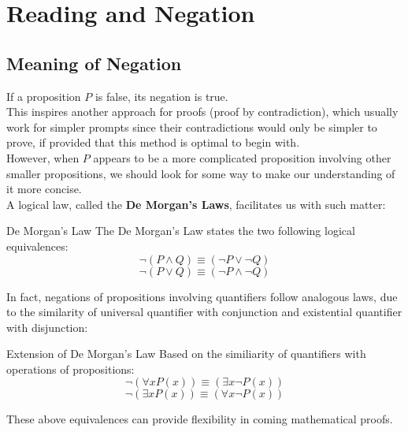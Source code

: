 \section{Reading and Negation}
\subsection{Meaning of Negation}
If a proposition $P$ is false, its negation is true. \\
This inspires another approach for proofs (proof by contradiction), which usually work for simpler prompts since their contradictions would only be simpler to prove, if provided that this method is optimal to begin with. \\
However, when $P$ appears to be a more complicated proposition involving other smaller propositions, we should look for some way to make our understanding of it more concise. \\
A logical law, called the \textbf{De Morgan's Laws}, facilitates us with such matter:
\begin{ln-axiom}{De Morgan's Law}{}
    The De Morgan's Law states the two following logical equivalences:
    \[\neg (P \land Q) \equiv (\neg P \lor \neg Q)\]
    \[\neg (P \lor Q) \equiv (\neg P \land \neg Q)\]
\end{ln-axiom}
In fact, negations of propositions involving quantifiers follow analogous laws, due to the similarity of universal quantifier with conjunction and existential quantifier with disjunction:
\begin{ln-axiom}{Extension of De Morgan's Law}{}
    Based on the similiarity of quantifiers with operations of propositions:
    \[\neg (\forall x P(x)) \equiv (\exists x \neg P(x))\]
    \[\neg (\exists x P(x)) \equiv (\forall x \neg P(x))\]
\end{ln-axiom}
These above equivalences can provide flexibility in coming mathematical proofs.

